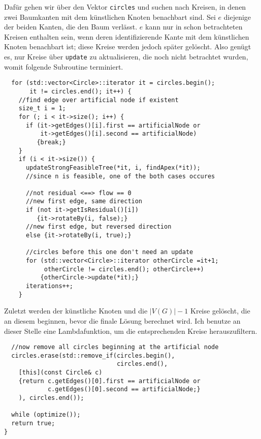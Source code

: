 Dafür gehen wir über den Vektor \lstinline|circles| und suchen nach Kreisen, in denen zwei Baumkanten mit dem künstlichen Knoten benachbart sind. Sei $e$ diejenige der beiden Kanten, die den Baum verlässt. $e$ kann nur in schon betrachteten Kreisen enthalten sein, wenn deren identifizierende Kante mit dem künstlichen Knoten benachbart ist; diese Kreise werden jedoch später gelöscht. Also genügt es, nur Kreise über \lstinline|update| zu aktualisieren, die noch nicht betrachtet wurden, womit folgende Subroutine terminiert.

\begin{lstlisting}
  for (std::vector<Circle>::iterator it = circles.begin();
       it != circles.end(); it++) {
    //find edge over artificial node if existent
    size_t i = 1;
    for (; i < it->size(); i++) {
      if (it->getEdges()[i].first == artificialNode or
          it->getEdges()[i].second == artificialNode)
         {break;}
    }
    if (i < it->size()) {
      updateStrongFeasibleTree(*it, i, findApex(*it));
      //since n is feasible, one of the both cases occures
  
      //not residual <==> flow == 0
      //new first edge, same direction
      if (not it->getIsResidual()[i])
         {it->rotateBy(i, false);}
      //new first edge, but reversed direction
      else {it->rotateBy(i, true);}
  
      //circles before this one don't need an update
      for (std::vector<Circle>::iterator otherCircle =it+1;
           otherCircle != circles.end(); otherCircle++)
          {otherCircle->update(*it);}
      iterations++;
    }
\end{lstlisting}

Zuletzt werden der künstliche Knoten und die $|V(G)|-1$ Kreise gelöscht, die an diesem beginnen, bevor die finale Lösung berechnet wird. Ich benutze an dieser Stelle eine Lambdafunktion, um die entsprechenden Kreise herauszufiltern.

\begin{lstlisting}
  //now remove all circles beginning at the artificial node
  circles.erase(std::remove_if(circles.begin(), 
                               circles.end(),
    [this](const Circle& c)
    {return c.getEdges()[0].first == artificialNode or
            c.getEdges()[0].second == artificialNode;}
    ), circles.end());

  while (optimize());
  return true;
}
\end{lstlisting} 